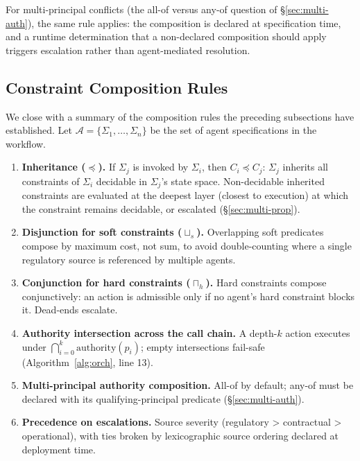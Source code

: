 \documentclass[11pt,a4paper]{article}
\theoremstyle{remark}
\begin{document}
For multi-principal conflicts (the all-of versus any-of question of \S\ref{sec:multi-auth}), the same rule applies: the composition is declared at specification time, and a runtime determination that a non-declared composition should apply triggers escalation rather than agent-mediated resolution.

\subsection{Constraint Composition Rules}\label{sec:multi-rules}

We close with a summary of the composition rules the preceding subsections have established. Let $\mathcal{A} = \{\Sigma_1, \ldots, \Sigma_n\}$ be the set of agent specifications in the workflow.

\begin{enumerate}[leftmargin=2em,topsep=0.3em,itemsep=0.3em]
\item \textbf{Inheritance ($\preceq$).} If $\Sigma_j$ is invoked by $\Sigma_i$, then $C_i \preceq C_j$: $\Sigma_j$ inherits all constraints of $\Sigma_i$ decidable in $\Sigma_j$'s state space. Non-decidable inherited constraints are evaluated at the deepest layer (closest to execution) at which the constraint remains decidable, or escalated (\S\ref{sec:multi-prop}).
\item \textbf{Disjunction for soft constraints ($\sqcup_s$).} Overlapping soft predicates compose by maximum cost, not sum, to avoid double-counting where a single regulatory source is referenced by multiple agents.
\item \textbf{Conjunction for hard constraints ($\sqcap_h$).} Hard constraints compose conjunctively: an action is admissible only if no agent's hard constraint blocks it. Dead-ends escalate.
\item \textbf{Authority intersection across the call chain.} A depth-$k$ action executes under $\bigcap_{i=0}^{k} \text{authority}(p_i)$; empty intersections fail-safe (Algorithm~\ref{alg:orch}, line 13).
\item \textbf{Multi-principal authority composition.} All-of by default; any-of must be declared with its qualifying-principal predicate (\S\ref{sec:multi-auth}).
\item \textbf{Precedence on escalations.} Source severity (regulatory > contractual > operational), with ties broken by lexicographic source ordering declared at deployment time.
\end{enumerate}
\end{document}
